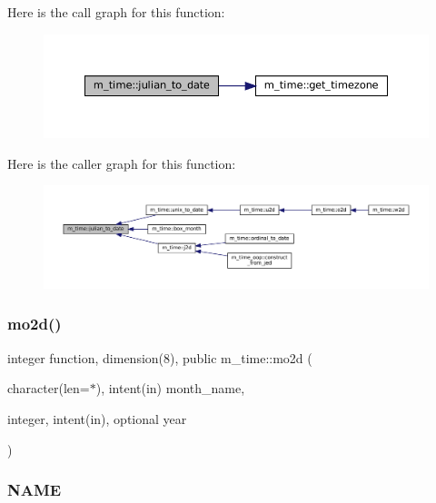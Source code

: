 Here is the call graph for this function\+:\nopagebreak
\begin{figure}[H]
\begin{center}
\leavevmode
\includegraphics[width=350pt]{namespacem__time_abb44cf18cd0a3e420c20469efb056203_cgraph}
\end{center}
\end{figure}
Here is the caller graph for this function\+:\nopagebreak
\begin{figure}[H]
\begin{center}
\leavevmode
\includegraphics[width=350pt]{namespacem__time_abb44cf18cd0a3e420c20469efb056203_icgraph}
\end{center}
\end{figure}
\mbox{\label{namespacem__time_a8188c7ed4e592c4f2388d28c75486726}} 
\subsubsection{\texorpdfstring{mo2d()}{mo2d()}}
{\footnotesize\ttfamily integer function, dimension(8), public m\+\_\+time\+::mo2d (\begin{DoxyParamCaption}\item[{character(len=$\ast$), intent(in)}]{month\+\_\+name,  }\item[{integer, intent(in), optional}]{year }\end{DoxyParamCaption})}



\subsubsection*{N\+A\+ME}

